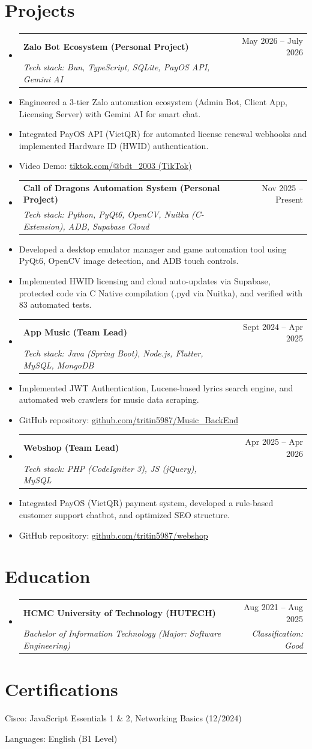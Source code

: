 \documentclass[a4paper,11pt]{article}
\makeatletter
\newcommand{\resumeItem}[1]{\item\small{#1}}
\newcommand{\resumeSubheading}[4]{
  \item
    \begin{tabular*}{0.97\textwidth}[t]{l@{\extracolsep{\fill}}r}
      \textbf{#1} & #2 \\
      \textit{#3} & \textit{#4} \\
    \end{tabular*}\vspace{-5pt}
}
\makeatother
\begin{document}
\section{Projects}
\begin{itemize}[leftmargin=0.15in, label={}]
    \resumeSubheading{Zalo Bot Ecosystem (Personal Project)}{May 2026 -- July 2026}{Tech stack: Bun, TypeScript, SQLite, PayOS API, Gemini AI}{}
    \resumeItem{Engineered a 3-tier Zalo automation ecosystem (Admin Bot, Client App, Licensing Server) with Gemini AI for smart chat.}
    \resumeItem{Integrated PayOS API (VietQR) for automated license renewal webhooks and implemented Hardware ID (HWID) authentication.}
    \resumeItem{Video Demo: \href{https://www.tiktok.com/@bdt_2003/video/7645397777387654420}{tiktok.com/@bdt\_2003 (TikTok)}}

    \resumeSubheading{Call of Dragons Automation System (Personal Project)}{Nov 2025 -- Present}{Tech stack: Python, PyQt6, OpenCV, Nuitka (C-Extension), ADB, Supabase Cloud}{}
    \resumeItem{Developed a desktop emulator manager and game automation tool using PyQt6, OpenCV image detection, and ADB touch controls.}
    \resumeItem{Implemented HWID licensing and cloud auto-updates via Supabase, protected code via C Native compilation (.pyd via Nuitka), and verified with 83 automated tests.}

    \resumeSubheading{App Music (Team Lead)}{Sept 2024 -- Apr 2025}{Tech stack: Java (Spring Boot), Node.js, Flutter, MySQL, MongoDB}{}
    \resumeItem{Implemented JWT Authentication, Lucene-based lyrics search engine, and automated web crawlers for music data scraping.}
    \resumeItem{GitHub repository: \href{https://github.com/tritin5987/Music_BackEnd}{github.com/tritin5987/Music\_BackEnd}}

    \resumeSubheading{Webshop (Team Lead)}{Apr 2025 -- Apr 2026}{Tech stack: PHP (CodeIgniter 3), JS (jQuery), MySQL}{}
    \resumeItem{Integrated PayOS (VietQR) payment system, developed a rule-based customer support chatbot, and optimized SEO structure.}
    \resumeItem{GitHub repository: \href{https://github.com/tritin5987/webshop}{github.com/tritin5987/webshop}}
\end{itemize}

\section{Education}
\begin{itemize}[leftmargin=0.15in, label={}]
    \resumeSubheading{HCMC University of Technology (HUTECH)}{Aug 2021 -- Aug 2025}{Bachelor of Information Technology (Major: Software Engineering)}{Classification: Good}
\end{itemize}

\section{Certifications}
\begin{itemize}[leftmargin=0.15in]
    \small{
      \item Cisco: JavaScript Essentials 1 \& 2, Networking Basics (12/2024)
      \item Languages: English (B1 Level)
    }
\end{itemize}
\end{document}
